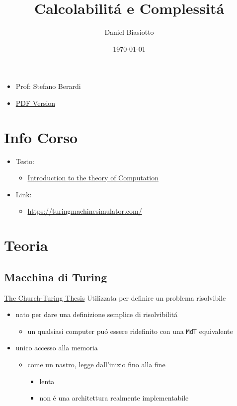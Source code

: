 \documentclass[
                        12pt, %
                        a4paper, %
                        oneside, %
                        headinclude,footinclude, %
                        BCOR5mm, %
                  ]{scrartcl}
\author{Daniel Biasiotto}
\date{\today}
\title{Calcolabilitá e Complessitá}
\begin{document}
\maketitle
\tableofcontents

\begin{itemize}
\item Prof: Stefano Berardi
\item \href{./20210921121153-calcolabilita\_e\_complessita.pdf}{PDF Version}
\end{itemize}
\section{Info Corso}
\label{sec:orgd5c305c}
\begin{itemize}
\item Testo:
\begin{itemize}
\item \href{20210921121359-introduction_to_the_theory_of_computation.org}{Introduction to the theory of Computation}
\end{itemize}
\item Link:
\begin{itemize}
\item \url{https://turingmachinesimulator.com/}
\end{itemize}
\end{itemize}
\section{Teoria}
\label{sec:org8e24937}
\subsection{Macchina di Turing}
\label{sec:org7fd5678}
\uline{The Church-Turing Thesis}
Utilizzata per definire un problema risolvibile
\begin{itemize}
\item nato per dare una definizione semplice di risolvibilitá
\begin{itemize}
\item un qualsiasi computer puó essere ridefinito con una \texttt{MdT} equivalente
\end{itemize}
\item unico accesso alla memoria
\begin{itemize}
\item come un nastro, legge dall'inizio fino alla fine
\begin{itemize}
\item lenta
\item non é una architettura realmente implementabile
\end{itemize}
\end{itemize}
\end{itemize}
\end{document}

